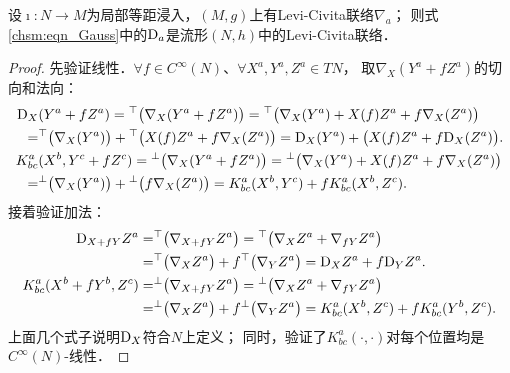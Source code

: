 \begin{theorem}\label{chsm:thm_Dg}
    设$\imath:N\to M$为局部等距浸入，$(M,g)$上有Levi-Civita联络$\nabla_a$；
    则式\eqref{chsm:eqn_Gauss}中的${\rm D}_a$是流形$(N,h)$中的Levi-Civita联络．
\end{theorem}
\begin{proof}
    先验证线性．$\forall f\in C^\infty(N)$、$\forall X^a,Y^a,Z^a\in TN$，
    取${\nabla}_{X} (Y^a+fZ^a)$的切向和法向：
    \begin{align*}
        {\rm D}_{X}& (Y^a+f Z^a)={}^{\top}\bigl({\nabla}_{X} (Y^a+f Z^a)\bigr) 
        ={}^{\top}\bigl({\nabla}_{X} (Y^a)+X(f)Z^a+f {\nabla}_{X} (Z^a)\bigr) \\
        =&{}^{\top}\bigl({\nabla}_{X} (Y^a) \bigr)+{}^{\top}\bigl(X(f)Z^a+f {\nabla}_{X} (Z^a)\bigr)  
        = {\rm D}_{X} (Y^a)+\bigl(X(f)Z^a +f {\rm D}_{X} (Z^a)\bigr). \\
        K^a_{bc} &(X^b,Y^c+f Z^c)={}^{\bot}\bigl({\nabla}_{X} (Y^a+fZ^a)\bigr) 
        ={}^{\bot}\bigl({\nabla}_{X} (Y^a)+X(f)Z^a+f{\nabla}_{X} (Z^a)\bigr) \\
        =& {}^{\bot}\bigl({\nabla}_{X} (Y^a)\bigr)
        +{}^{\bot}\bigl(f{\nabla}_{X} (Z^a)\bigr)
        = K^a_{bc} (X^b,Y^c)+f K^a_{bc} (X^b,Z^c).
    \end{align*}
    接着验证加法：
    \begin{align*}
        {\rm D}_{X+fY} Z^a=&{}^{\top}\bigl({\nabla}_{X+fY} Z^a\bigr) 
        ={}^{\top}\bigl({\nabla}_{X} Z^a+{\nabla}_{fY} Z^a\bigr) \\
        =&{}^{\top}\bigl({\nabla}_{X} Z^a\bigr)+f{}^{\top}\bigl({\nabla}_{Y} Z^a\bigr)
        ={\rm D}_{X} Z^a + f{\rm D}_{Y} Z^a . \\
        K^a_{bc} (X^b+fY^b, Z^c)=&{}^{\bot}\bigl({\nabla}_{X+fY} Z^a\bigr) 
        ={}^{\bot}\bigl({\nabla}_{X} Z^a+{\nabla}_{fY} Z^a\bigr) \\
        =&{}^{\bot}\bigl({\nabla}_{X} Z^a\bigr)+f{}^{\bot}\bigl({\nabla}_{Y} Z^a\bigr)
        =K^a_{bc} (X^b, Z^c)+f K^a_{bc} (Y^b, Z^c) .
    \end{align*}
    上面几个式子说明${\rm D}_X$符合$N$上定义；
    同时，验证了$K^a_{bc} (\cdot, \cdot)$对每个位置均是$C^\infty(N)$-线性．


\end{proof}
